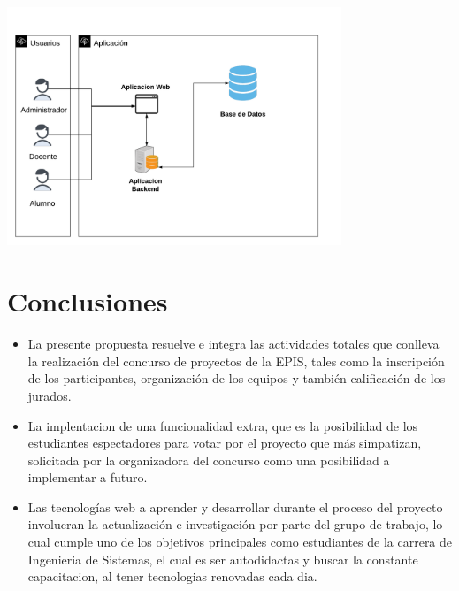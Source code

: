 \documentclass[%
 reprint,
 amsmath,amssymb,
 aps,
]{revtex4-1}
\begin{document}
\begin{center}
\includegraphics[width=10cm]{./Imagenes/qa}
\end{center}

\section{Conclusiones}

\begin{itemize}
\item La presente propuesta resuelve e integra las actividades totales que conlleva la realización del concurso de proyectos de la EPIS, tales como la inscripción de los participantes, organización de los equipos y también calificación de los jurados. 

\item La implentacion de una funcionalidad extra, que es la posibilidad de los estudiantes espectadores  para votar por el proyecto que más simpatizan,  solicitada por la organizadora del concurso como una posibilidad a implementar a futuro. 

\item Las tecnologías web a aprender y desarrollar durante el proceso del proyecto involucran la actualización e investigación por parte del grupo de trabajo, lo cual cumple uno de los objetivos principales como estudiantes de la carrera de Ingenieria de Sistemas, el cual es ser autodidactas y buscar la constante capacitacion, al tener tecnologias renovadas cada dia.
 

\end{itemize}


%
%
\end{document}
